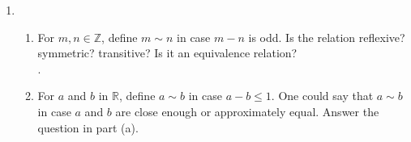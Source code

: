 \documentclass[11pt]{article}
\newcommand{\R}{\mathbb{R}}
\newcommand{\Z}{\mathbb{Z}}
\begin{document}
\begin{enumerate}
\[\begin{tikzpicture}
	\begin{scope}[>={Stealth[black]},
	              every node/.style={fill=white,circle},
	              every edge/.style={draw=black}]
	    	\path (1) edge (2);
	    	\path (2) edge (3);
		\path (3) edge[loop below] (3);
	\end{scope}
	\end{tikzpicture}
	\cong
	\begin{tikzpicture}
	\begin{scope}[every node/.style={circle,thick,draw}]
	    \node (1) at (0,0) {$1$};
	    \node (2) at (2,0) {$2$};
	    \node (3) at (1,-1) {$3$};
	\end{scope}
	
	\begin{scope}[>={Stealth[black]},
	              every node/.style={fill=white,circle},
	              every edge/.style={draw=black}]
	    	\path (1) edge[loop above] (1);
	    	\path (1) edge (3);
		\path (3) edge (2);
	\end{scope}
	\end{tikzpicture}
\]
	\begin{enumerate}
	\item Give a picture of another graph isomorphic to these two.\\
	.
	\item Find a graph with vertex set $\{1,2,3\}$ that is not isomorphic to the graphs yet has three edges and exactly one is 
	a loop.\\
	.
	\item Find another example as in part(b) that isn't isomorphic to the answer of part(b) and the other two graphs.\\
	.
	\item Show that $\cong$ is an equivalence relation on the set of all graphs with the vertex set $\{1,2,...,n\}$.\\
	.
	\end{enumerate}
\setcounter{enumi}{7}
\item
	\begin{enumerate}
	\item For $m,n\in\Z$, define $m\sim n$ in case $m-n$ is odd. Is the relation reflexive? symmetric? transitive? Is it an 
	equivalence relation?\\
	.
	\item For $a$ and $b$ in $\R$, define $a\sim b$ in case $a-b\leq 1$. One could say that $a\sim b$ in case $a$ and $b$ are 
	close enough or approximately equal. Answer the question in part (a).\\

\end{enumerate}
\end{enumerate}
\end{document}
